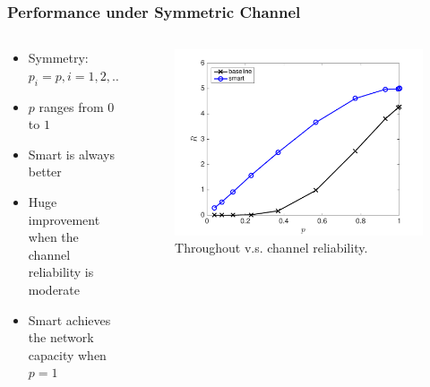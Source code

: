 \documentclass{beamer}
\begin{document}
\begin{frame}
\frametitle{Performance under Symmetric Channel}
\begin{columns}
  \begin{column}{.5\textwidth}
    \begin{itemize}
      \item Symmetry: $p_i=p, i=1,2,\dotsc,N$
      \item $p$ ranges from $0$ to $1$
      \item Smart is always better
      \item Huge improvement when the channel reliability is moderate
      \item Smart achieves the network capacity when $p=1$
    \end{itemize}
  \end{column}
  \begin{column}{.5\textwidth}
    \begin{figure}[htbp]
      \centering
      \includegraphics[height=.5\textheight]{R_p_sym.pdf}
      \caption{Throughout v.s. channel reliability.}
    \end{figure}
  \end{column}
\end{columns}
\end{frame}
\end{document}
